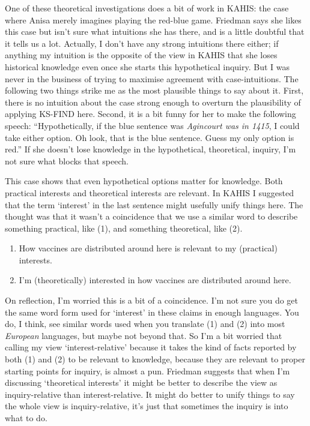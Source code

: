 \documentclass[
  11pt,
  letterpaper,
  DIV=11,
  numbers=noendperiod,
  twoside]{scrartcl}
\providecommand{\tightlist}{%
  \setlength{\itemsep}{0pt}\setlength{\parskip}{0pt}}
\begin{document}
One of these theoretical investigations does a bit of work in KAHIS: the
case where Anisa merely imagines playing the red-blue game. Friedman
says she likes this case but isn't sure what intuitions she has there,
and is a little doubtful that it tells us a lot. Actually, I don't have
any strong intuitions there either; if anything my intuition is the
opposite of the view in KAHIS that she loses historical knowledge even
once she starts this hypothetical inquiry. But I was never in the
business of trying to maximise agreement with case-intuitions. The
following two things strike me as the most plausible things to say about
it. First, there is no intuition about the case strong enough to
overturn the plausibility of applying KS-FIND here. Second, it is a bit
funny for her to make the following speech: ``Hypothetically, if the
blue sentence was \emph{Agincourt was in 1415}, I could take either
option. Oh look, that is the blue sentence. Guess my only option is
red.'' If she doesn't lose knowledge in the hypothetical, theoretical,
inquiry, I'm not sure what blocks that speech.

This case shows that even hypothetical options matter for knowledge.
Both practical interests and theoretical interests are relevant. In
KAHIS I suggested that the term `interest' in the last sentence might
usefully unify things here. The thought was that it wasn't a coincidence
that we use a similar word to describe something practical, like (1),
and something theoretical, like (2).

\begin{enumerate}
\def\labelenumi{(\arabic{enumi})}
\tightlist
\item
  How vaccines are distributed around here is relevant to my (practical)
  interests.
\item
  I'm (theoretically) interested in how vaccines are distributed around
  here.
\end{enumerate}

On reflection, I'm worried this is a bit of a coincidence. I'm not sure
you do get the same word form used for `interest' in these claims in
enough languages. You do, I think, see similar words used when you
translate (1) and (2) into most \emph{European} languages, but maybe not
beyond that. So I'm a bit worried that calling my view
`interest-relative' because it takes the kind of facts reported by both
(1) and (2) to be relevant to knowledge, because they are relevant to
proper starting points for inquiry, is almost a pun. Friedman suggests
that when I'm discussing `theoretical interests' it might be better to
describe the view as inquiry-relative than interest-relative. It might
do better to unify things to say the whole view is inquiry-relative,
it's just that sometimes the inquiry is into what to do.
\end{document}
